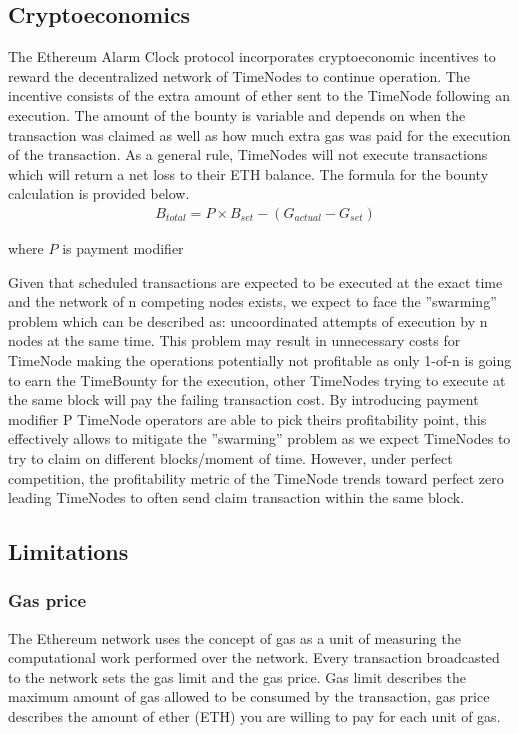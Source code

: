 \documentclass{article}
\begin{document}
{  \subsection{Cryptoeconomics}
  The Ethereum Alarm Clock protocol incorporates cryptoeconomic incentives to reward the decentralized network of TimeNodes to continue operation. The incentive consists of the extra amount of ether sent to the TimeNode following an execution. The amount of the bounty is variable and depends on when the transaction was claimed as well as how much extra gas was paid for the execution of the transaction. As a general rule, TimeNodes will not execute transactions which will return a net loss to their ETH balance. The formula for the bounty calculation is provided below.
  \begin{align*}
    &B_{total} = P \times B_{set} - (G_{actual} - G_{set})
  \end{align*}

  where $P$ is payment modifier
 
  Given that scheduled transactions are expected to be executed at the exact time and the network of n competing nodes exists, we expect to face the ”swarming” problem which can be described as: uncoordinated attempts of execution by n nodes at the same time. This problem may result in unnecessary costs for TimeNode making the operations potentially not profitable as only 1-of-n is going to earn the TimeBounty for the execution, other TimeNodes trying to execute at the same block will pay the failing transaction cost. By introducing payment modifier P TimeNode operators are able to pick theirs profitability point, this effectively allows to mitigate the ”swarming” problem as we expect TimeNodes to try to claim on different blocks/moment of time. However, under perfect competition, the profitability metric of the TimeNode trends toward perfect zero leading TimeNodes to often send claim transaction within the same block.
  \subsection{Limitations}
  \subsubsection{Gas price}
  The Ethereum network uses the concept of gas as a unit of measuring the computational work performed over the network. Every transaction broadcasted to the network sets the gas limit and the gas price. Gas limit describes the maximum amount of gas allowed to be consumed by the transaction, gas price describes the amount of ether (ETH) you are willing to pay for each unit of gas.

}
\end{document}
